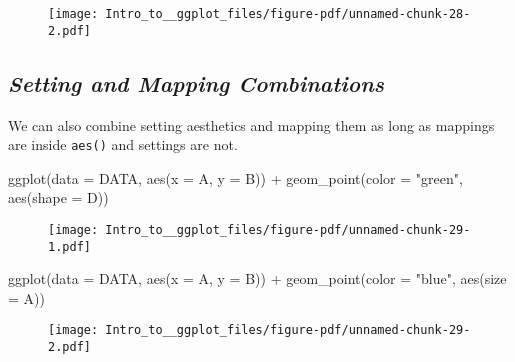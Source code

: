 \documentclass[
  letterpaper,
  DIV=11,
  numbers=noendperiod]{scrartcl}
\newenvironment{Shaded}{\begin{snugshade}}{\end{snugshade}}
\newcommand{\AttributeTok}[1]{\textcolor[rgb]{0.40,0.45,0.13}{#1}}
\newcommand{\FunctionTok}[1]{\textcolor[rgb]{0.28,0.35,0.67}{#1}}
\newcommand{\NormalTok}[1]{\textcolor[rgb]{0.00,0.23,0.31}{#1}}
\newcommand{\SpecialCharTok}[1]{\textcolor[rgb]{0.37,0.37,0.37}{#1}}
\newcommand{\StringTok}[1]{\textcolor[rgb]{0.13,0.47,0.30}{#1}}
\begin{document}
\begin{figure}[H]

{\centering \texttt{[image: Intro\_to\_\_ggplot\_files/figure-pdf/unnamed-chunk-28-2.pdf]}

}

\end{figure}

\hypertarget{setting-and-mapping-combinations}{%
\subsection{\texorpdfstring{\emph{Setting and Mapping
Combinations}}{Setting and Mapping Combinations}}\label{setting-and-mapping-combinations}}

We can also combine setting aesthetics and mapping them as long as
mappings are inside \texttt{aes()} and settings are not.

\begin{Shaded}
\begin{Highlighting}[]
\FunctionTok{ggplot}\NormalTok{(}\AttributeTok{data =}\NormalTok{ DATA, }\FunctionTok{aes}\NormalTok{(}\AttributeTok{x =}\NormalTok{ A, }\AttributeTok{y =}\NormalTok{ B)) }\SpecialCharTok{+} 
  \FunctionTok{geom\_point}\NormalTok{(}\AttributeTok{color =} \StringTok{"green"}\NormalTok{, }\FunctionTok{aes}\NormalTok{(}\AttributeTok{shape =}\NormalTok{ D))}
\end{Highlighting}
\end{Shaded}

\begin{figure}[H]

{\centering \texttt{[image: Intro\_to\_\_ggplot\_files/figure-pdf/unnamed-chunk-29-1.pdf]}

}

\end{figure}

\begin{Shaded}
\begin{Highlighting}[]
\FunctionTok{ggplot}\NormalTok{(}\AttributeTok{data =}\NormalTok{ DATA, }\FunctionTok{aes}\NormalTok{(}\AttributeTok{x =}\NormalTok{ A, }\AttributeTok{y =}\NormalTok{ B)) }\SpecialCharTok{+} 
  \FunctionTok{geom\_point}\NormalTok{(}\AttributeTok{color =} \StringTok{"blue"}\NormalTok{, }\FunctionTok{aes}\NormalTok{(}\AttributeTok{size =}\NormalTok{ A))}
\end{Highlighting}
\end{Shaded}

\begin{figure}[H]

{\centering \texttt{[image: Intro\_to\_\_ggplot\_files/figure-pdf/unnamed-chunk-29-2.pdf]}

}

\end{figure}
\end{document}

